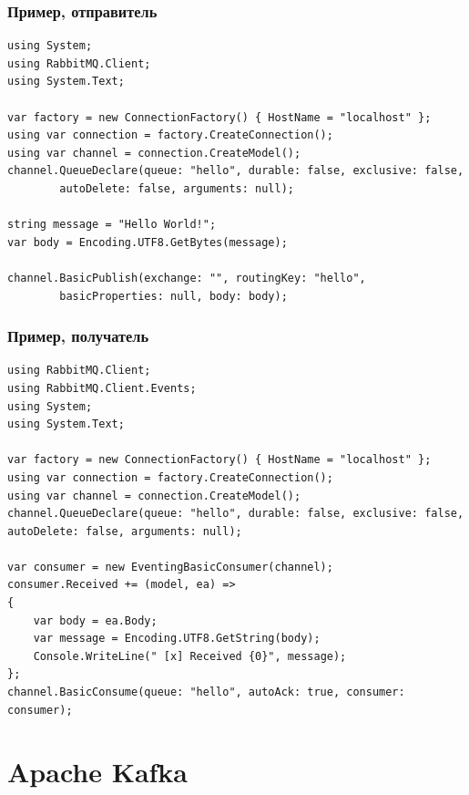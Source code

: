 \documentclass{../../slides-style}
\begin{document}
    \begin{frame}[fragile]
        \frametitle{Пример, отправитель}
        \begin{ssmall}
            \begin{verbatim}
using System;
using RabbitMQ.Client;
using System.Text;

var factory = new ConnectionFactory() { HostName = "localhost" };
using var connection = factory.CreateConnection();
using var channel = connection.CreateModel();
channel.QueueDeclare(queue: "hello", durable: false, exclusive: false,
        autoDelete: false, arguments: null);

string message = "Hello World!";
var body = Encoding.UTF8.GetBytes(message);

channel.BasicPublish(exchange: "", routingKey: "hello",
        basicProperties: null, body: body);
            \end{verbatim}
        \end{ssmall}
    \end{frame}

    \begin{frame}[fragile]
        \frametitle{Пример, получатель}
        \begin{ssmall}
            \begin{verbatim}
using RabbitMQ.Client;
using RabbitMQ.Client.Events;
using System;
using System.Text;

var factory = new ConnectionFactory() { HostName = "localhost" };
using var connection = factory.CreateConnection();
using var channel = connection.CreateModel();
channel.QueueDeclare(queue: "hello", durable: false, exclusive: false, autoDelete: false, arguments: null);

var consumer = new EventingBasicConsumer(channel);
consumer.Received += (model, ea) =>
{
    var body = ea.Body;
    var message = Encoding.UTF8.GetString(body);
    Console.WriteLine(" [x] Received {0}", message);
};
channel.BasicConsume(queue: "hello", autoAck: true, consumer: consumer);
            \end{verbatim}
        \end{ssmall}
    \end{frame}

    \section{Apache Kafka}
\end{document}
